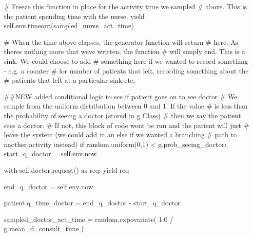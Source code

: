 \documentclass[
  letterpaper,
  DIV=11,
  numbers=noendperiod]{scrreprt}
\newenvironment{Shaded}{}{}
\newcommand{\CommentTok}[1]{\textcolor[rgb]{0.42,0.45,0.49}{#1}}
\newcommand{\ControlFlowTok}[1]{\textcolor[rgb]{0.84,0.23,0.29}{#1}}
\newcommand{\DecValTok}[1]{\textcolor[rgb]{0.00,0.36,0.77}{#1}}
\newcommand{\FloatTok}[1]{\textcolor[rgb]{0.00,0.36,0.77}{#1}}
\newcommand{\ImportTok}[1]{\textcolor[rgb]{0.01,0.18,0.38}{#1}}
\newcommand{\NormalTok}[1]{\textcolor[rgb]{0.14,0.16,0.18}{#1}}
\newcommand{\OperatorTok}[1]{\textcolor[rgb]{0.14,0.16,0.18}{#1}}
\newcommand{\VariableTok}[1]{\textcolor[rgb]{0.89,0.38,0.04}{#1}}
\begin{document}
\begin{tcolorbox}
\begin{Shaded}
\begin{Highlighting}[]
            \CommentTok{\# Freeze this function in place for the activity time we sampled}
            \CommentTok{\# above.  This is the patient spending time with the nurse.}
            \ControlFlowTok{yield} \VariableTok{self}\NormalTok{.env.timeout(sampled\_nurse\_act\_time)}

            \CommentTok{\# When the time above elapses, the generator function will return}
            \CommentTok{\# here.  As there\textquotesingle{}s nothing more that we\textquotesingle{}ve written, the function}
            \CommentTok{\# will simply end.  This is a sink.  We could choose to add}
            \CommentTok{\# something here if we wanted to record something {-} e.g. a counter}
            \CommentTok{\# for number of patients that left, recording something about the}
            \CommentTok{\# patients that left at a particular sink etc.}

        \CommentTok{\#\#NEW added conditional logic to see if patient goes on to see doctor}
        \CommentTok{\# We sample from the uniform distribution between 0 and 1.  If the value}
        \CommentTok{\# is less than the probability of seeing a doctor (stored in g Class)}
        \CommentTok{\# then we say the patient sees a doctor.}
        \CommentTok{\# If not, this block of code won\textquotesingle{}t be run and the patient will just}
        \CommentTok{\# leave the system (we could add in an else if we wanted a branching}
        \CommentTok{\# path to another activity instead)}
        \ControlFlowTok{if}\NormalTok{ random.uniform(}\DecValTok{0}\NormalTok{,}\DecValTok{1}\NormalTok{) }\OperatorTok{\textless{}}\NormalTok{ g.prob\_seeing\_doctor:}
\NormalTok{            start\_q\_doctor }\OperatorTok{=} \VariableTok{self}\NormalTok{.env.now}

            \ControlFlowTok{with} \VariableTok{self}\NormalTok{.doctor.request() }\ImportTok{as}\NormalTok{ req:}
                \ControlFlowTok{yield}\NormalTok{ req}

\NormalTok{                end\_q\_doctor }\OperatorTok{=} \VariableTok{self}\NormalTok{.env.now}

\NormalTok{                patient.q\_time\_doctor }\OperatorTok{=}\NormalTok{ end\_q\_doctor }\OperatorTok{{-}}\NormalTok{ start\_q\_doctor}

\NormalTok{                sampled\_doctor\_act\_time }\OperatorTok{=}\NormalTok{ random.expovariate(}
                    \FloatTok{1.0} \OperatorTok{/}\NormalTok{ g.mean\_d\_consult\_time}
\NormalTok{                )}


\end{Highlighting}
\end{Shaded}
\end{tcolorbox}
\end{document}
